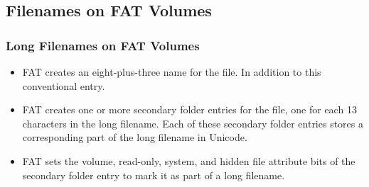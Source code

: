 % 
% 
\subsection{Filenames on FAT Volumes} %
\begin{frame}[fragile]
    \frametitle{Long Filenames on FAT Volumes}
    \begin{itemize}
        \item FAT creates an {\color{red}eight-plus-three name} for the file. In addition to this conventional entry.  \pause
        \item FAT creates {\color{red}one or more secondary folder entries} for the file, one for each 13 characters in the {\color{red}long filename}. Each of these secondary folder entries stores a corresponding part of the long filename in Unicode. \pause
        \item FAT sets the volume, read-only, system, and hidden {\color{red}file attribute bits} of the secondary folder entry to mark it as part of a long filename. 
    \end{itemize}
\end{frame}
% 
% 
